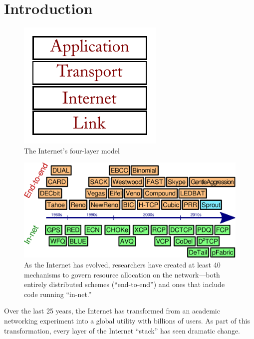 \chapter{Introduction}
\label{chap:intro}

\begin{figure}
\caption{The Internet's four-layer model}
\label{f:stack}
\begin{centering}
\includegraphics{layers.pdf}

\end{centering}
\end{figure}

\begin{figure}
\caption{As the Internet has evolved, researchers have created at
  least 40 mechanisms to govern resource allocation on the
  network---both entirely distributed schemes (``end-to-end'') and
  ones that include code running ``in-net.''}
\label{f:march}

\vspace{\baselineskip}

\begin{centering}
\noindent \includegraphics[width=\textwidth]{march2-all.pdf}

\end{centering}
\end{figure}

Over the last 25 years, the Internet has transformed from an academic
networking experiment into a global utility with billions of
users. As part of this transformation, every layer of the Internet
``stack'' has seen dramatic change.


